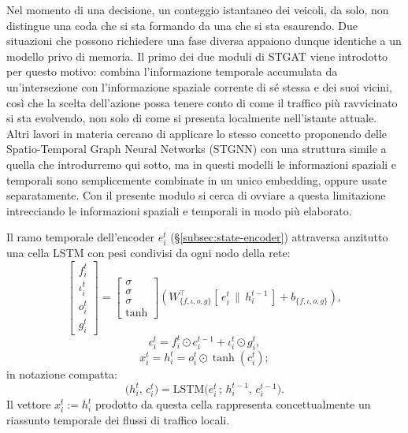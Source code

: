 Nel momento di una decisione, un conteggio istantaneo dei veicoli, da solo, non distingue una coda che si
sta formando da una che si sta esaurendo. Due situazioni che possono
richiedere una fase diversa appaiono dunque identiche a un modello privo
di memoria. Il primo dei due moduli di STGAT viene introdotto per questo motivo:
combina l'informazione temporale accumulata da un'intersezione con
l'informazione spaziale corrente di sé stessa e dei suoi vicini, così che la scelta dell'azione
possa tenere conto di come il traffico più ravvicinato si sta
evolvendo, non solo di come si presenta localmente nell'istante attuale.
Altri lavori in materia cercano di applicare lo stesso concetto proponendo delle Spatio-Temporal Graph Neural Networks (STGNN) con una struttura simile a quella che introdurremo qui sotto,
ma in questi modelli le informazioni spaziali e temporali sono semplicemente combinate in un unico embedding, oppure usate separatamente.
Con il presente modulo si cerca di ovviare a questa limitazione intrecciando le informazioni spaziali e temporali in modo più elaborato.

Il ramo temporale dell'encoder $e_i^t$ (§\ref{subsec:state-encoder})
attraversa anzitutto una cella LSTM con pesi condivisi da ogni nodo della rete:
\begin{equation}
  \begin{bmatrix} f_i^t \\ \iota_i^t \\ o_i^t \\ g_i^t \end{bmatrix} =
  \begin{bmatrix} \sigma \\ \sigma \\ \sigma \\ \tanh \end{bmatrix}
  \left(
  W_{\{f,\iota,o,g\}}^{\top} [\,e_i^t \,\|\, h_i^{t-1}\,] + b_{\{f,\iota,o,g\}}
  \right),
  \label{eq:stgat-lstm-gates}
\end{equation}
\[ c_i^t = f_i^t \odot c_i^{t-1} + \iota_i^t \odot g_i^t, \]
\[ x_i^t = h_i^t = o_i^t \odot \tanh(c_i^t); \]
in notazione compatta:
\begin{equation}
  \big(h_i^t,\, c_i^t\big) = \mathrm{LSTM}\big(e_i^t \,;\, h_i^{t-1},\, c_i^{t-1}\big).
  \label{eq:stgat-lstm-compact}
\end{equation}
Il vettore $x_i^t := h_i^t$ prodotto da questa cella rappresenta concettualmente un riassunto temporale dei flussi di traffico locali.

